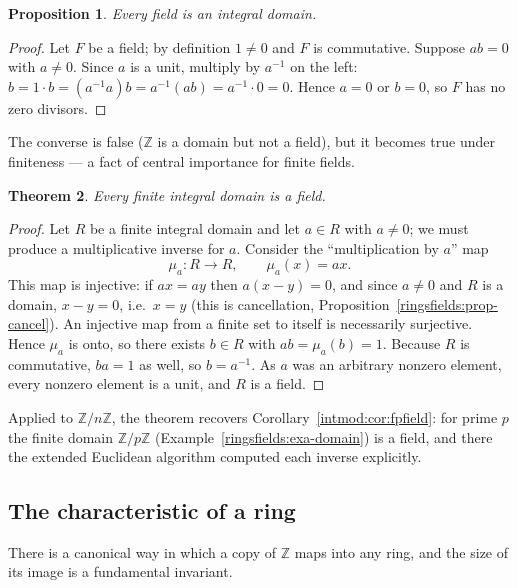 \documentclass[11pt,a4paper]{article}
\newtheorem{theorem}{Theorem}[section]
\newtheorem{proposition}[theorem]{Proposition}
\theoremstyle{definition}
\theoremstyle{remark}
\newcommand{\Z}{\ensuremath{\mathbb{Z}}}
\begin{document}
\begin{proposition}\label{ringsfields:prop-field-domain}
Every field is an integral domain.
\end{proposition}

\begin{proof}
Let \(F\) be a field; by definition \(1\neq 0\) and \(F\) is commutative. Suppose \(ab=0\) with \(a\neq 0\). Since \(a\) is a unit, multiply by \(a^{-1}\) on the left: \(b = 1\cdot b = (a^{-1}a)b = a^{-1}(ab) = a^{-1}\cdot 0 = 0\). Hence \(a=0\) or \(b=0\), so \(F\) has no zero divisors.
\end{proof}

The converse is false (\(\Z\) is a domain but not a field), but it becomes true under finiteness --- a fact of central importance for finite fields.

\begin{theorem}\label{ringsfields:thm-finite-domain}
Every finite integral domain is a field.
\end{theorem}

\begin{proof}
Let \(R\) be a finite integral domain and let \(a\in R\) with \(a\neq 0\); we must produce a multiplicative inverse for \(a\). Consider the ``multiplication by \(a\)'' map
\[
\mu_a\colon R\to R,\qquad \mu_a(x) = ax .
\]
This map is injective: if \(ax = ay\) then \(a(x-y)=0\), and since \(a\neq 0\) and \(R\) is a domain, \(x-y=0\), i.e.\ \(x=y\) (this is cancellation, Proposition~\ref{ringsfields:prop-cancel}). An injective map from a finite set to itself is necessarily surjective. Hence \(\mu_a\) is onto, so there exists \(b\in R\) with \(ab = \mu_a(b) = 1\). Because \(R\) is commutative, \(ba=1\) as well, so \(b = a^{-1}\). As \(a\) was an arbitrary nonzero element, every nonzero element is a unit, and \(R\) is a field.
\end{proof}

Applied to \(\Z/n\Z\), the theorem recovers Corollary~\ref{intmod:cor:fpfield}: for prime \(p\) the finite domain \(\Z/p\Z\) (Example~\ref{ringsfields:exa-domain}) is a field, and there the extended Euclidean algorithm computed each inverse explicitly.

\subsection{The characteristic of a ring}\label{ringsfields:subsec-char}

There is a canonical way in which a copy of \(\Z\) maps into any ring, and the size of its image is a fundamental invariant.
\end{document}
